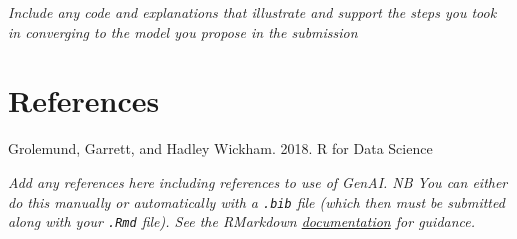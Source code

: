 \documentclass[
]{article}
\begin{document}
\emph{Include any code and explanations that illustrate and support the
steps you took in converging to the model you propose in the submission}

\section{References}\label{references}

Grolemund, Garrett, and Hadley Wickham. 2018. R for Data Science

\emph{Add any references here including references to use of GenAI. NB
You can either do this manually or automatically with a \texttt{.bib}
file (which then must be submitted along with your \texttt{.Rmd} file).
See the RMarkdown
\href{https://bookdown.org/yihui/rmarkdown-cookbook/bibliography.html}{documentation}
for guidance.}
\end{document}

